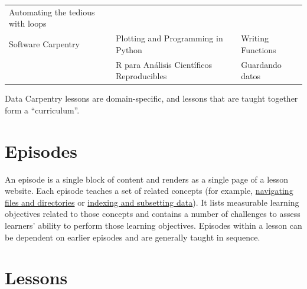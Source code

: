 \documentclass[
]{book}
\begin{document}
\begin{longtable}[]{@{}lll@{}}
\begin{minipage}[t]{0.24\columnwidth}
Automating the tedious with loops\strut
\end{minipage}\tabularnewline
\begin{minipage}[t]{0.47\columnwidth}\raggedright
Software Carpentry\strut
\end{minipage} & \begin{minipage}[t]{0.20\columnwidth}\raggedright
Plotting and Programming in Python\strut
\end{minipage} & \begin{minipage}[t]{0.24\columnwidth}\raggedright
Writing Functions\strut
\end{minipage}\tabularnewline
\begin{minipage}[t]{0.47\columnwidth}\raggedright
\strut
\end{minipage} & \begin{minipage}[t]{0.20\columnwidth}\raggedright
R para Análisis Científicos Reproducibles\strut
\end{minipage} & \begin{minipage}[t]{0.24\columnwidth}\raggedright
Guardando datos\strut
\end{minipage}\tabularnewline
\bottomrule
\end{longtable}

Data Carpentry lessons are domain-specific, and lessons that are taught together form a ``curriculum''.

\hypertarget{episodes}{%
\section{Episodes}\label{episodes}}

An episode is a single block of content and renders as a single page of a lesson website.
Each episode teaches a set of related concepts (for example,
\href{http://swcarpentry.github.io/shell-novice/02-filedir/index.html}{navigating files and directories}
or \href{https://datacarpentry.org/python-ecology-lesson/03-index-slice-subset/index.html}{indexing and subsetting data}).
It lists measurable learning objectives related to those concepts
and contains a number of challenges to assess
learners' ability to perform those learning objectives. Episodes within a lesson can be
dependent on earlier episodes and are generally taught in sequence.

\hypertarget{lessons}{%
\section{Lessons}\label{lessons}}
\end{document}
